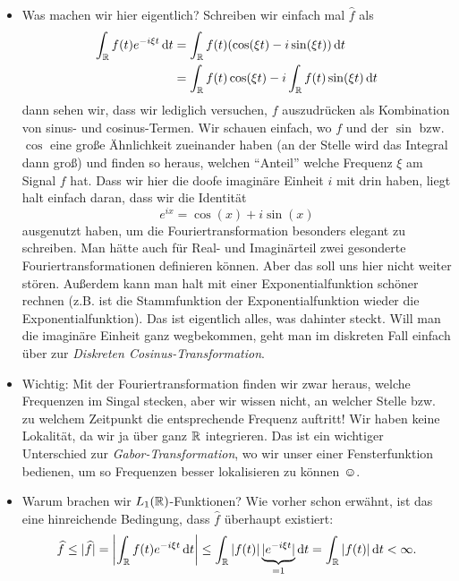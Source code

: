 \begin{remark}\leavevmode
\begin{itemize}
\item Was machen wir hier eigentlich? Schreiben wir einfach mal $ \widehat{f} $ als
\begin{align*}
   \int_{\R} f(t) e^{-i\xi t} \dif t
&= \int_{\R} f(t) (\cos(\xi t) - i\sin(\xi t)) \dif t \\
&= \int_{\R} f(t) \cos(\xi t) - i \int_{\R} f(t) \sin(\xi t) \dif t
\end{align*}
dann sehen wir, dass wir lediglich versuchen, $ f $ auszudrücken als Kombination von sinus- und
cosinus-Termen. Wir schauen einfach, wo $ f $ und der $ \sin $ bzw. $ \cos $ eine große Ähnlichkeit
zueinander haben (an der Stelle wird das Integral dann groß) und finden so heraus, welchen 
\enquote{Anteil} welche Frequenz $ \xi $ am Signal $ f $ hat. Dass wir hier die doofe imaginäre 
Einheit $ i $ mit drin haben, liegt halt einfach daran, dass wir die Identität
\[
  e^{ix} = \cos(x) + i \sin(x)
\]
ausgenutzt haben, um die Fouriertransformation besonders elegant zu schreiben. Man hätte auch für
Real- und Imaginärteil zwei gesonderte Fouriertransformationen definieren können. Aber das soll uns
hier nicht weiter stören. Außerdem kann man halt mit einer Exponentialfunktion schöner rechnen 
(z.B. ist die Stammfunktion der Exponentialfunktion wieder die Exponentialfunktion). Das ist 
eigentlich alles, was dahinter steckt. Will man die imaginäre Einheit ganz wegbekommen, geht man 
im diskreten Fall einfach über zur \emph{Diskreten Cosinus-Transformation}.
\item Wichtig: Mit der Fouriertransformation finden wir zwar heraus, welche Frequenzen im Singal 
stecken,
aber wir wissen nicht, an welcher Stelle bzw. zu welchem Zeitpunkt die entsprechende Frequenz 
auftritt! Wir haben keine Lokalität, da wir ja über ganz $ \mathbb{R} $ integrieren. Das ist ein wichtiger 
Unterschied zur \emph{Gabor-Transformation}, wo wir unser einer Fensterfunktion bedienen, um so 
Frequenzen besser lokalisieren zu können $ \smiley $.
\item Warum brachen wir $ L_{1}(\mathbb{R}) $-Funktionen? Wie vorher schon erwähnt, ist das eine 
hinreichende Bedingung, dass $ \widehat{f} $ überhaupt existiert:
\[
  \widehat{f} \leq |\widehat{f}| = \left| \int_{\R} f(t) e^{-i\xi t} \dif t \right|
  \leq \int_{\R} |f(t)| \underbrace{|e^{-i\xi t}|}_{= 1} \dif t = \int_{\R} |f(t)| \dif t < \infty.
\]
\end{itemize}
\end{remark}



